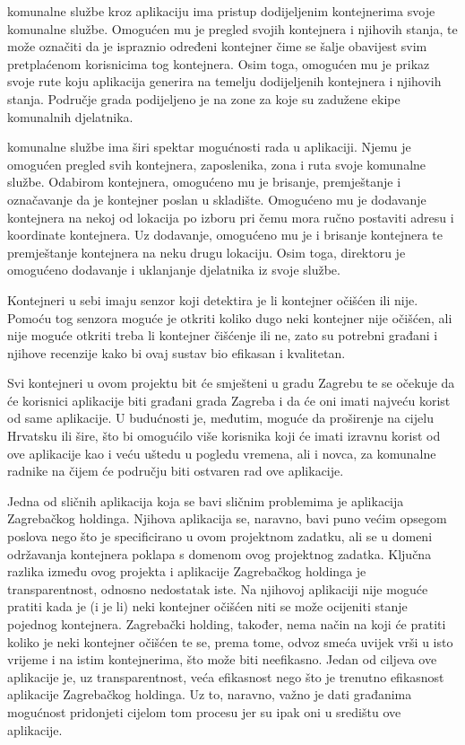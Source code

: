 		 komunalne službe kroz aplikaciju ima pristup dodijeljenim kontejnerima svoje komunalne službe.
		Omogućen mu je pregled svojih kontejnera i njihovih stanja, te može označiti da je ispraznio određeni kontejner čime se šalje obavijest svim pretplaćenom korisnicima tog kontejnera. 
		Osim toga, omogućen mu je prikaz svoje rute koju aplikacija generira na temelju dodijeljenih kontejnera i njihovih stanja. Područje grada podijeljeno je na zone za koje su zadužene ekipe komunalnih djelatnika. 
		
		 komunalne službe ima širi spektar mogućnosti rada u aplikaciji. 
		Njemu je omogućen pregled svih kontejnera, zaposlenika, zona i ruta svoje komunalne službe. 
		Odabirom kontejnera, omogućeno mu je brisanje, premještanje i označavanje da je kontejner poslan u skladište.
		Omogućeno mu je dodavanje kontejnera na nekoj od lokacija po izboru pri čemu mora ručno postaviti adresu i koordinate kontejnera. Uz dodavanje, omogućeno mu je i brisanje kontejnera te premještanje kontejnera na neku drugu lokaciju.
		Osim toga, direktoru je omogućeno dodavanje i uklanjanje djelatnika iz svoje službe.
		
		Kontejneri u sebi imaju senzor koji detektira je li kontejner očišćen ili nije. Pomoću tog senzora moguće je otkriti koliko dugo neki kontejner nije očišćen, ali nije moguće otkriti treba li kontejner čišćenje ili ne, zato su potrebni građani i njihove recenzije kako bi ovaj sustav bio efikasan i kvalitetan.
		
		Svi kontejneri u ovom projektu bit će smješteni u gradu Zagrebu te se očekuje da će korisnici aplikacije biti građani grada Zagreba i da će oni imati najveću korist od same aplikacije. U budućnosti je, međutim, moguće da proširenje na cijelu Hrvatsku ili šire, što bi omogućilo više korisnika koji će imati izravnu korist od ove aplikacije kao i veću uštedu u pogledu vremena, ali i novca, za komunalne radnike na čijem će području biti ostvaren rad ove aplikacije.
		
		Jedna od sličnih aplikacija koja se bavi sličnim problemima je aplikacija Zagrebačkog holdinga. Njihova aplikacija se, naravno, bavi puno većim opsegom poslova nego što je specificirano u ovom projektnom zadatku, ali se u domeni održavanja kontejnera poklapa s domenom ovog projektnog zadatka. Ključna razlika između ovog projekta i aplikacije Zagrebačkog holdinga je transparentnost, odnosno nedostatak iste. Na njihovoj aplikaciji nije moguće pratiti kada je (i je li) neki kontejner očišćen niti se može ocijeniti stanje pojednog kontejnera. Zagrebački holding, također, nema način na koji će pratiti koliko je neki kontejner očišćen te se, prema tome, odvoz smeća uvijek vrši u isto vrijeme i na istim kontejnerima, što može biti neefikasno. Jedan od ciljeva ove aplikacije je, uz transparentnost, veća efikasnost nego što je trenutno efikasnost aplikacije Zagrebačkog holdinga. Uz to, naravno, važno je dati građanima mogućnost pridonjeti cijelom tom procesu jer su ipak oni u središtu ove aplikacije. 
		
